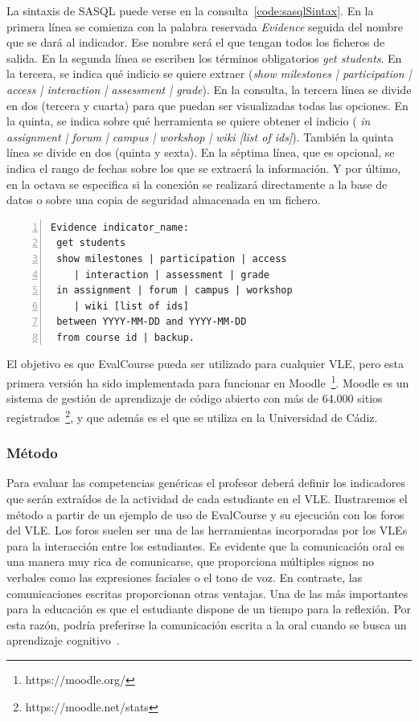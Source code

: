 La sintaxis de SASQL puede verse en la consulta~\ref{code:sasqlSintax}. En la primera línea se comienza con la palabra reservada \emph{Evidence} seguida del nombre que se dará al indicador. Ese nombre será el que tengan todos los ficheros de salida. En la segunda línea se escriben los términos obligatorios \emph{get students}. En la tercera, se indica qué indicio se quiere extraer (\emph{show milestones | participation | access | interaction | assessment | grade}). En la consulta, la tercera línea se divide en dos (tercera y cuarta) para que puedan ser visualizadas todas las opciones. En la quinta, se indica sobre qué herramienta se quiere obtener el indicio (\emph{ in assignment | forum | campus | workshop | wiki [list of ids]}). También la quinta línea se divide en dos (quinta y sexta). En la séptima línea, que es opcional, se indica el rango de fechas sobre los que se extraerá la información. Y por último, en la octava se especifica si la conexión se realizará directamente a la base de datos o sobre una copia de seguridad almacenada en un fichero.

\begin{lstlisting}[caption=Sintaxis de SASQL (las palabras reservadas se muestran resaltadas),label=code:sasqlSintax,numbers=left, captionpos=b, morekeywords={Evidence,get, students, show, milestones, participation, access, in, assignment, forum, campus, wiki, between, and, workshop, interaction, assessment, grade, from, course, backup}]
Evidence indicator_name:
 get students 
 show milestones | participation | access 
	| interaction | assessment | grade
 in assignment | forum | campus | workshop 
	| wiki [list of ids]
 between YYYY-MM-DD and YYYY-MM-DD
 from course id | backup.
\end{lstlisting}

El objetivo es que EvalCourse pueda ser utilizado para cualquier VLE, pero esta primera versión ha sido implementada para funcionar en Moodle~\footnote{https://moodle.org/}. Moodle es un sistema de gestión de aprendizaje de código abierto con más de 64.000 sitios registrados~\footnote{https://moodle.net/stats}, y que además es el que se utiliza en la Universidad de Cádiz.

\subsubsection{Método}

Para evaluar las competencias genéricas el profesor deberá definir los indicadores que serán extraídos de la actividad de cada estudiante en el VLE. Ilustraremos el método a partir de un ejemplo de uso de EvalCourse y su ejecución con los foros del VLE. Los foros suelen ser una de las herramientas incorporadas por los VLEs para la interacción entre los estudiantes. Es evidente que la comunicación oral es una manera muy rica de comunicarse, que proporciona múltiples signos no verbales como las expresiones faciales o el tono de voz. En contraste, las comunicaciones escritas proporcionan otras ventajas. Una de las más importantes para la educación es que el estudiante dispone de un tiempo para la reflexión. Por esta razón, podría preferirse la comunicación escrita a la oral cuando se busca un aprendizaje cognitivo~\cite{garrison1999critical}.

